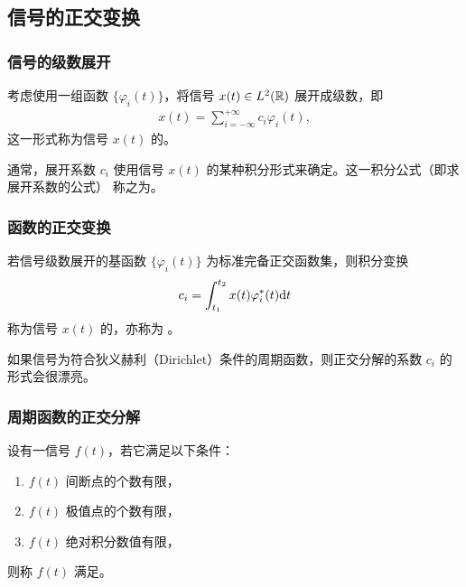 \subsection{信号的正交变换}

\subsubsection{信号的级数展开}

\begin{definition}[信号的级数展开]
    考虑使用一组函数 $\{\varphi_i(t)\}$，将信号 $x(t) \in L^2(\mathbb{R})$ 展开成级数，即
    \begin{align*}
        x(t) = \sum_{i = -\infty}^{+\infty}c_i\varphi_i(t),
    \end{align*}
    这一形式称为信号 $x(t)$ 的。

    通常，展开系数 $c_i$ 使用信号 $x(t)$ 的某种积分形式来确定。这一积分公式（即求展开系数的公式）
    称之为。
\end{definition}

\subsubsection{函数的正交变换}

\begin{definition}[函数的正交变换]
    若信号级数展开的基函数 $\{\varphi_i(t)\}$ 为标准完备正交函数集，则积分变换
    \begin{align*}
        c_i = \int_{t_1}^{t_2}x(t)\varphi_i^*(t)\mathrm{d}t
    \end{align*}
    称为信号 $x(t)$ 的，亦称为 。
\end{definition}

\begin{note}
    如果信号为符合狄义赫利（Dirichlet）条件的周期函数，则正交分解的系数 $c_i$ 的形式会很漂亮。
\end{note}

\subsubsection{周期函数的正交分解}

\begin{definition}[狄义赫利条件]
    设有一信号 $f(t)$，若它满足以下条件：
    \begin{enumerate}[label=(\arabic*)]
        \item $f(t)$ 间断点的个数有限，
        \item $f(t)$ 极值点的个数有限，
        \item $f(t)$ 绝对积分数值有限，
    \end{enumerate}
    则称 $f(t)$ 满足。
\end{definition}

